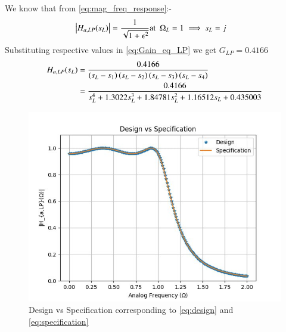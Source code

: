 \documentclass{article}
\begin{document}
\begin{enumerate}
We know that from \eqref{eq:mag_freq_response}:-
  \begin{align}
\left\vert H_{a,LP}(s_L)\right\vert & = \frac{1}{\sqrt{1+\epsilon^2}} \text{at} \hspace{5pt} \Omega_{L}=1 \implies s_{L} = j \label{eq:Gain_eq_LP}
\end{align}
Substituting respective values in \eqref{eq:Gain_eq_LP} we get $G_{LP}=0.4166$
\begin{align}
H_{a,LP}(s_L) & = \frac{0.4166}{\left(s_L-s_1\right)\left(s_L-s_2\right)\left(s_L-s_3\right)\left(s_L-s_4\right)}                          \\
     & = \frac{0.4166}{s_{L}^4 + 1.3022s_{L}^3 +1.84781s_{L}^2 + 1.16512s_{L} +0.435003}\label{eq:design}
  \end{align}
\begin{figure}[H]
\centering
\includegraphics[width=1\columnwidth]{figs/Design_vs_Specification.png}
 \caption{Design vs Specification corresponding to \eqref{eq:design} and \eqref{eq:specification}}
 \label{fig:design_vs_specf}
 \end{figure}
          

\end{enumerate}
\end{document}
